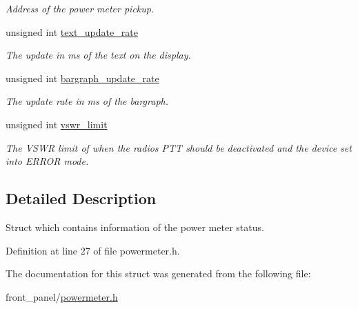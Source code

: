 \begin{CompactItemize}
\begin{CompactList}\small\item\em Address of the power meter pickup. \item\end{CompactList}\item 
\hypertarget{structpowermeter__struct_9706eac55d4f86534ad4972ac7b808ab}{
unsigned int \hyperlink{structpowermeter__struct_9706eac55d4f86534ad4972ac7b808ab}{text\_\-update\_\-rate}}
\label{structpowermeter__struct_9706eac55d4f86534ad4972ac7b808ab}

\begin{CompactList}\small\item\em The update in ms of the text on the display. \item\end{CompactList}\item 
\hypertarget{structpowermeter__struct_f5667537d92ab5a007b682a6b276d0d0}{
unsigned int \hyperlink{structpowermeter__struct_f5667537d92ab5a007b682a6b276d0d0}{bargraph\_\-update\_\-rate}}
\label{structpowermeter__struct_f5667537d92ab5a007b682a6b276d0d0}

\begin{CompactList}\small\item\em The update rate in ms of the bargraph. \item\end{CompactList}\item 
\hypertarget{structpowermeter__struct_16541f4f1f3b04c5aa0bb36120900e92}{
unsigned int \hyperlink{structpowermeter__struct_16541f4f1f3b04c5aa0bb36120900e92}{vswr\_\-limit}}
\label{structpowermeter__struct_16541f4f1f3b04c5aa0bb36120900e92}

\begin{CompactList}\small\item\em The VSWR limit of when the radios PTT should be deactivated and the device set into ERROR mode. \item\end{CompactList}\end{CompactItemize}


\subsection{Detailed Description}
Struct which contains information of the power meter status. 

Definition at line 27 of file powermeter.h.

The documentation for this struct was generated from the following file:\begin{CompactItemize}
\item 
front\_\-panel/\hyperlink{powermeter_8h}{powermeter.h}\end{CompactItemize}
